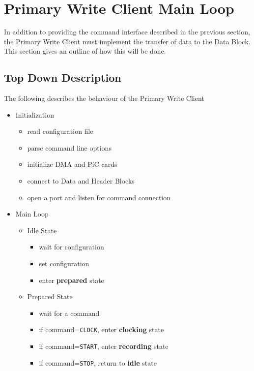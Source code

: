 \section{Primary Write Client Main Loop}
\label{sec:pwc_main}

In addition to providing the command interface described in the
previous section, the Primary Write Client must implement the transfer
of data to the Data Block.  This section gives an outline of how this
will be done.

\subsection{Top Down Description}

The following describes the behaviour of the Primary Write Client

\begin{itemize}
\item Initialization
\vspace{-3mm}
	\begin{itemize}
	\item read configuration file
	\item parse command line options
	\item initialize DMA and PiC cards
	\item connect to Data and Header Blocks
	\item open a port and listen for command connection
	\end{itemize}
\item Main Loop
\vspace{-3mm}
	\begin{itemize}
	\item Idle State
	\vspace{-2mm}
		\begin{itemize}
		\item wait for configuration
		\item set configuration
		\item enter {\bf prepared} state
		\end{itemize}
	\item Prepared State
	\vspace{-2mm}
		\begin{itemize}
		\item wait for a command
		\item if command={\tt CLOCK}, enter {\bf clocking} state
		\item if command={\tt START}, enter {\bf recording} state
		\item if command={\tt STOP}, return to {\bf idle} state

\end{itemize}
\end{itemize}
\end{itemize}
